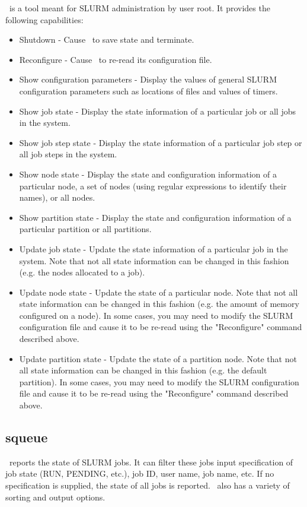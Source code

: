 \scontrol\ is a tool meant for SLURM administration by user root. 
It provides the following capabilities:
\begin{itemize}
\item Shutdown - Cause \slurmctld\ to save state and terminate.
\item Reconfigure - Cause \slurmctld\ to re-read its configuration file.
\item Show configuration parameters - Display the values of general SLURM 
configuration parameters such as locations of files and values of timers.  
\item Show job state - Display the state information of a particular job 
or all jobs in the system.
\item Show job step state - Display the state information of a particular 
job step or all job steps in the system.
\item Show node state - Display the state and configuration information 
of a particular node, a set of nodes (using regular expressions to 
identify their names), or all nodes.
\item Show partition state - Display the state and configuration information 
of a particular partition or all partitions.
\item Update job state - Update the state information of a particular job 
in the system. Note that not all state information can be changed in this 
fashion (e.g. the nodes allocated to a job).
\item Update node state - Update the state of a particular node. Note that 
not all state information can be changed in this fashion (e.g. the amount 
of memory configured on a node). In some cases, you may need to modify 
the SLURM configuration file and cause it to be re-read using the "Reconfigure" 
command described above.
\item Update partition state - Update the state of a partition node. Note that 
not all state information can be changed in this fashion (e.g. the default 
partition). In some cases, you may need to modify the SLURM configuration 
file and cause it to be re-read using the "Reconfigure" command described above.
\end{itemize}

\subsection{squeue}

\squeue\ reports the state of SLURM jobs.  It can filter these
jobs input specification of job state (RUN, PENDING, etc.), job ID,
user name, job name, etc.  If no specification is supplied, the state of
all jobs is reported. \squeue\ also has a variety of sorting and 
output options.

